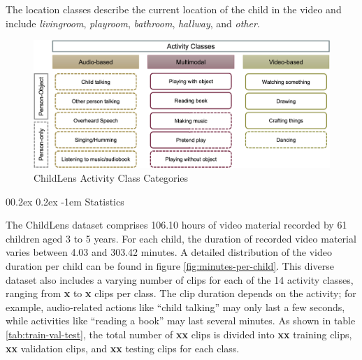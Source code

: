 \documentclass[
  man,floatsintext]{apa6}
\makeatletter
\let\oldparagraph\paragraph
\renewcommand{\paragraph}{
    \@ifstar
      \xxxParagraphStar
      \xxxParagraphNoStar
  }
\newcommand{\xxxParagraphStar}[1]{\oldparagraph*{#1}\mbox{}}
\newcommand{\xxxParagraphNoStar}[1]{\oldparagraph{#1}\mbox{}}
\renewcommand{\paragraph}{\@startsection{paragraph}{4}{\parindent}%
  {0\baselineskip \@plus 0.2ex \@minus 0.2ex}%
  {-1em}%
  {\normalfont\normalsize\bfseries\itshape\typesectitle}}
\makeatother
\begin{document}
The location classes describe the current location of the child in the video and include \emph{livingroom}, \emph{playroom}, \emph{bathroom}, \emph{hallway}, and \emph{other}.

\begin{figure}

{\centering \includegraphics[width=5.95in]{activity_classes} 

}

\caption{ChildLens Activity Class Categories}\label{fig:activity-classes}
\end{figure}

\paragraph{Statistics}\label{statistics}

The ChildLens dataset comprises 106.10 hours of video material recorded by 61 children aged 3 to 5 years. For each child, the duration of recorded video material varies between 4.03 and 303.42 minutes. A detailed distribution of the video duration per child can be found in figure \ref{fig:minutes-per-child}. This diverse dataset also includes a varying number of clips for each of the 14 activity classes, ranging from \textbf{x} to \textbf{x} clips per class. The clip duration depends on the activity; for example, audio-related actions like ``child talking'' may only last a few seconds, while activities like ``reading a book'' may last several minutes. As shown in table \ref{tab:train-val-test}, the total number of \textbf{xx} clips is divided into \textbf{xx} training clips, \textbf{xx} validation clips, and \textbf{xx} testing clips for each class.
\end{document}
